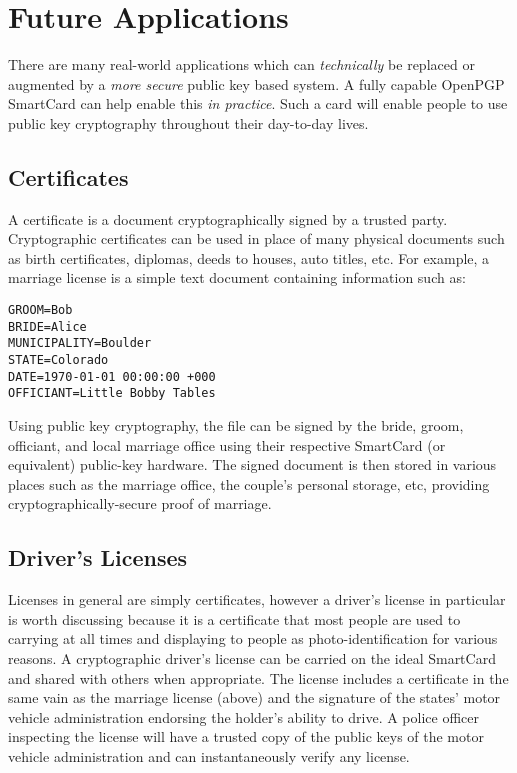 \documentclass[11pt, twocolumn]{article}
\begin{document}
\section{Future Applications}
\label{sec:future}

There are many real-world applications which can \textit{technically}
be replaced or augmented by a \textit{more secure} public key based
system. A fully capable OpenPGP SmartCard can help enable this
\textit{in practice}. Such a card will enable people to use public key
cryptography throughout their day-to-day lives.

\subsection{Certificates}

A certificate is a document cryptographically signed by a trusted
party.  Cryptographic certificates can be used in place of many
physical documents such as birth certificates, diplomas, deeds to
houses, auto titles, etc. For example, a marriage license is a simple
text document containing information such as:

\begin{verbatim}
GROOM=Bob
BRIDE=Alice
MUNICIPALITY=Boulder
STATE=Colorado
DATE=1970-01-01 00:00:00 +000
OFFICIANT=Little Bobby Tables
\end{verbatim}

Using public key cryptography, the file can be signed by the bride,
groom, officiant, and local marriage office using their respective
SmartCard (or equivalent) public-key hardware. The signed document is
then stored in various places such as the marriage office, the
couple's personal storage, etc, providing cryptographically-secure
proof of marriage.

\subsection{Driver's Licenses}

Licenses in general are simply certificates, however a driver's
license in particular is worth discussing because it is a certificate
that most people are used to carrying at all times and displaying to
people as photo-identification for various reasons. A cryptographic
driver's license can be carried on the ideal SmartCard and shared with
others when appropriate. The license includes a certificate in the
same vain as the marriage license (above) and the signature of the
states' motor vehicle administration endorsing the holder's ability to
drive. A police officer inspecting the license will have a trusted
copy of the public keys of the motor vehicle administration and can
instantaneously verify any license.
\end{document}
